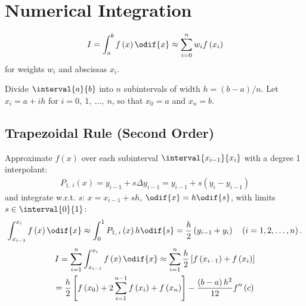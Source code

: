 \documentclass{article}
\begin{document}
\begin{minipage}[t]{62.39259259mm}
    \section{Numerical Integration}
    \begin{equation*}
        I = \int_a^b f\left( x \right) \odif{x} \approx \sum_{i = 0}^n w_i f\left( x_i \right)
    \end{equation*}
    for weights \(w_i\) and abscissas \(x_i\).

    Divide \(\interval{a}{b}\) into \(n\) subintervals of width \(h = \left( b - a \right) / n\).
    Let \(x_i = a + i h\) for \(i = 0,\: 1,\: \ldots,\: n\), so that \(x_0 = a\) and \(x_n = b\).
\end{minipage}\hfill%
\begin{minipage}[t]{126.1962963mm}
    \subsection{Trapezoidal Rule (Second Order)}
    Approximate \(f\left( x \right)\) over each subinterval \(\interval{x_{i - 1}}{x_i}\) with a degree 1 interpolant:
    \begin{align*}
        P_{1,\: i}\left( x \right) = y_{i - 1} + s \Delta{y_{i - 1}} = y_{i - 1} + s \left( y_i - y_{i - 1} \right)
    \end{align*}
    and integrate w.r.t. \(s\): \(x = x_{i - 1} + s h\), \(\odif{x} = h \odif{s}\), with limits \(s \in \interval{0}{1}\):
    \begin{align*}
        \int_{x_{i - 1}}^{x_i} f\left( x \right) \odif{x} \approx \int_0^1 P_{1,\: i}\left( x \right) h \odif{s} = \frac{h}{2} \left( y_{i - 1} + y_i \right) \quad \left(i = 1, 2, \ldots, n\right).
    \end{align*}
    \begin{multline*}
        I = \sum_{i = 1}^n \int_{x_{i-1}}^{x_i} f\left( x \right) \odif{x} \approx \sum_{i = 1}^n \frac{h}{2} \left[ f\left( x_{i - 1} \right) + f\left( x_i \right) \right]                                                                           \\
        = \frac{h}{2} \left[ f\left( x_0 \right) + 2 \sum_{i = 1}^{n - 1} f\left( x_i \right) + f\left( x_n \right) \right] -\frac{\left( b - a \right)h^2}{12} f''\left( c \right)
    \end{multline*}

\end{minipage}
\end{document}
